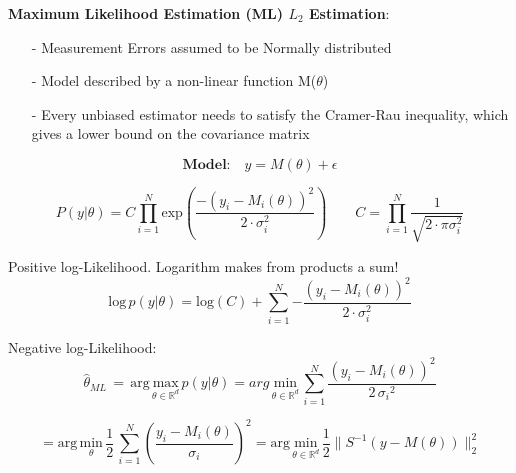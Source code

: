 \begin{tcolorbox}[colback=yellow!5!white,colframe=yellow!75!white,coltitle=black,title=\textbf{Maximum Likelihood Estimation}]
\textbf{Maximum Likelihood Estimation (ML) ${L}_{2}$ Estimation}:
\begin{itemize}
	\item[-] Measurement Errors assumed to be Normally distributed
	
	\item[-] Model described by a non-linear function M(\(\theta\))
	
	\item[-] Every unbiased estimator needs to satisfy the Cramer-Rau inequality, which gives a lower bound on the covariance matrix
\end{itemize}

	

	\begin{equation*}
	\textbf{Model:} \quad y = M(\theta) + \epsilon
	\end{equation*}
	
	\begin{equation*}
	{ P(y|\theta ) }=C\prod _{ i=1 }^{ N }{ \text{exp}(\frac { -(y_{ i }-M_{ i }(\theta))^{ 2 } }{ 2\cdot \sigma _{ i }^{ 2 } } )}  
	\quad \quad
	C = \prod_{ i = 1 }^{ N } { \frac{ 1 }{ \sqrt{ 2 \cdot \pi \sigma_{ i }^2 } } }
	\end{equation*}
	
	Positive log-Likelihood. Logarithm makes from products a sum!
	\begin{equation*}
	\text{log} \, p(y|\theta ) = \text{log} (C) + \sum_{ i=1 }^{ N }{  - \frac { (y_{ i }-M_{ i }(\theta ))^{ 2 } }{ 2 \cdot \sigma_{ i }^2  }  } 
	\end{equation*}
	
	Negative log-Likelihood:
	\begin{equation*}
	\hat{\theta}_{ML} \, = \, \text{arg} \, \underset { \theta \in { \mathbb{R} }^{ d } }{ \text{max}} \, p(y|\theta ) = arg \, \underset { \theta \in { \mathbb{R} }^{ d } }{ \text{min} } \, \sum_{ i=1 }^{ N }{ \frac { (y_{ i }-M_{ i }(\theta ))^{ 2 } }{ 2\, { \sigma_{ i } }^{ 2 } }  }
	\end{equation*}
	
	\begin{equation*}
	= \text{arg} \, \underset{\theta}{ \text{min} } \, \frac{1}{2} \, \sum_{ i=1 }^{ N }{ \left( \frac { y_{ i } - M_{ i }( \theta ) }{ \sigma_{ i } } \right)^2 } = \text{arg} \, \underset{ \theta \in { \mathbb{R} }^d }{ \text{min} } \, \frac{1}{2} \parallel S^{ -1 } (y - M(\theta) ){ \parallel  }_{ 2 }^{ 2 }
	\end{equation*}
	

\end{tcolorbox}
